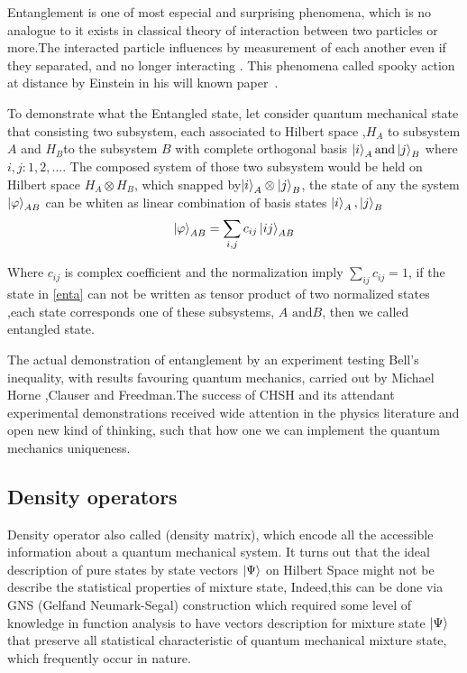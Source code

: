 
Entanglement is one of most especial and surprising phenomena, which is no analogue to it exists in classical theory of  interaction between two particles or more\citep{PhysRevLett.78.5022}.The interacted particle influences by measurement of each another even if they separated,  and no longer interacting . This phenomena  called spooky action at distance by Einstein in his will known paper~\cite{EPR}.

To demonstrate what the Entangled state, let consider  quantum mechanical state  that consisting two subsystem, each associated to  Hilbert space ,$H_A$ to subsystem $A$ and $H_B$to the subsystem $B$ with complete orthogonal basis $\ket{i}_A \text{and} \ket{j}_B$  where $i,j:1,2,\dots$. 
The composed system of those two subsystem would be held on Hilbert space  $H_A\otimes H_B$, which snapped  by$\ket{i}_A \otimes \ket{j}_B$, the state of any the system $\ket{\varphi}_{AB}$ can be whiten as linear combination of basis states $\ket{i}_A ,\ket{j}_B$
\begin{equation}\label{enta}
\ket{\varphi}_{AB}=\sum_{i,j} c_{ij} \ket{ij}_{AB}
\end{equation}

Where $c_{ij}$ is complex coefficient and the normalization imply $\sum_{ij} c_{ij}=1$, if the state in \ref{enta}  can not be written as tensor product of two normalized states ,each state corresponds   one of these subsystems, $A\text{ and} B$,  then we called entangled state.

The actual demonstration of entanglement by an experiment testing Bell’s inequality, with results favouring quantum mechanics, carried out by Michael Horne ,Clauser and Freedman\citep{PhysRevLett.23.880}.The success of CHSH and its attendant experimental demonstrations received wide attention in the physics literature and open new kind of thinking, such that how one we can implement the quantum mechanics uniqueness.
\subsection{Density operators}
Density operator also called (density matrix), which encode all the accessible information about a quantum mechanical system.  It turns out that the ideal description of pure states by state vectors $\ket{\Psi}$  on Hilbert Space might not be describe the statistical properties of mixture state, Indeed,this can be done via  GNS (Gelfand Neumark-Segal)  construction \citep{book:72351}which required some level of knowledge in function analysis  to have  vectors description  for  mixture state  $\ket{\Psi}$ that preserve all statistical characteristic of quantum mechanical mixture state, which frequently occur in nature.


